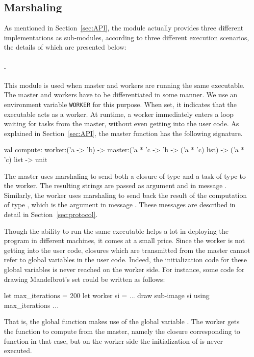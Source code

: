 \documentclass{llncs}
\begin{document}
\subsection{Marshaling}

  As mentioned in Section~\ref{sec:API}, the  module
  actually provides three different implementations as sub-modules, according to
  three different execution scenarios, the details of which are
  presented below:

  \paragraph{.} This module is used when master and workers
  are running the same executable. The master and workers have to be
  differentiated in some manner. We use an environment variable
  \texttt{WORKER} for this purpose. When set, it indicates that the
  executable acts as a worker. At runtime, a worker immediately
  enters a loop waiting for tasks from the master, without even
  getting into the user code.  As explained in Section~\ref{sec:API},
  the master function has the following signature.
  \begin{ocaml}
  val compute: worker:('a -> 'b) -> 
    master:('a * 'c -> 'b -> ('a * 'c) list) -> ('a * 'c) list -> unit
  \end{ocaml}
  The master uses marshaling to send both a closure of type  and a task of type  to the worker. The resulting
  strings are passed as argument  and  in message
  . Similarly, the worker uses marshaling to send back the
  result of the computation of type , which is the argument
   in message . These messages are described in
  detail in Section~\ref{sec:protocol}.

  Though the ability to run the same executable helps a lot in
  deploying the program in different machines, it comes at a small
  price. Since the worker is not getting into the user code, closures
  which are transmitted from the master cannot refer to global
  variables in the user code. Indeed, the initialization code for
  these global variables is never reached on the worker side. For
  instance, some code for drawing Mandelbrot's set
  could be written as follows:
  \begin{ocaml}
    let max_iterations = 200 
    let worker si = ... draw sub-image si using max_iterations ...
  \end{ocaml}
  That is, the global function  makes use of the global
  variable . The worker gets the function to
  compute from the master, namely the closure corresponding to
  function  in that case, but on the worker side the
  initialization of  is never executed.
\end{document}
